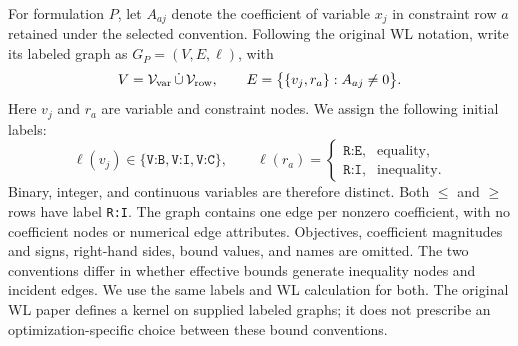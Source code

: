 \documentclass[10pt]{article}
\begin{document}
For formulation $P$, let $A_{aj}$ denote the coefficient of variable
$x_j$ in constraint row $a$ retained under the selected convention.
Following the original WL
notation, write its labeled graph as $G_P=(V,E,\ell)$, with
\[
 V=\mathcal V_{\rm var}\,\dot\cup\,\mathcal V_{\rm row},
 \qquad
 E=\big\{\{v_j,r_a\}:A_{aj}\ne0\big\}.
\]
Here $v_j$ and $r_a$ are variable and constraint nodes. We assign the
following initial labels:
\[
\ell(v_j)\in
\{\texttt{V:B},\texttt{V:I},\texttt{V:C}\},\qquad
\ell(r_a)=
\begin{cases}
 \texttt{R:E},&\text{equality},\\
 \texttt{R:I},&\text{inequality}.
\end{cases}
\]
Binary, integer, and continuous variables are therefore distinct.
Both $\leq$ and $\geq$ rows have label \texttt{R:I}.
The graph contains one edge per nonzero coefficient, with no coefficient
nodes or numerical edge attributes. Objectives, coefficient magnitudes
and signs, right-hand sides, bound values, and names are omitted.
The two conventions differ in whether effective bounds generate
inequality nodes and incident edges. We use the same labels and WL
calculation for both. The original WL paper defines a kernel on supplied
labeled graphs; it does not prescribe an optimization-specific choice
between these bound conventions.
\end{document}
